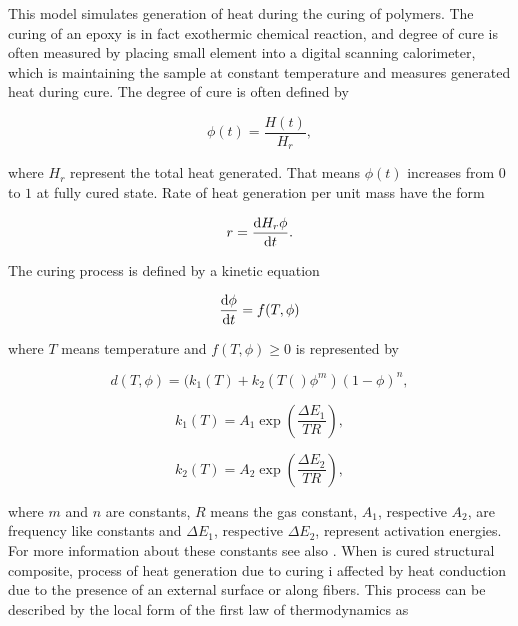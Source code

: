This model simulates generation of heat during the curing of polymers. The curing of an epoxy is in fact exothermic chemical reaction, and degree of cure is often measured by placing small element into a digital scanning calorimeter, which is maintaining the sample at constant temperature and measures generated heat during cure. The degree of cure is often defined by

\begin{equation}
	\phi(t) = \dfrac{H(t)}{H_r},
\end{equation}

where $H_r$ represent the total heat generated. That means $\phi(t)$ increases from $0$ to $1$ at fully cured state. Rate of heat generation per unit mass have the form

\begin{equation}
	r = \dv{H_r\phi}{t}.
\end{equation}

The curing process is defined by a kinetic equation 

\begin{equation}\label{eq:curing_process}
	\dv{\phi}{t} = f(T,\phi)
\end{equation}

where $T$ means temperature and $f(T,\phi)\geq 0$ is represented by 

\begin{equation}\label{eq:temperature_function}
	d(T,\phi) = (k_1(T)+k_2(T()\phi^m)(1-\phi)^n,
\end{equation}

\begin{equation}
	k_1(T) = A_1 \exp \left(\dfrac{\Delta E_1}{TR}\right),
\end{equation}

\begin{equation}
	k_2(T) = A_2 \exp \left( \dfrac{\Delta E_2}{TR}\right),
\end{equation}

where $m$ and $n$ are constants, $R$ means the gas constant, $A_1$, respective $A_2$, are frequency like constants and $\Delta E_1$, respective $\Delta E_2$, represent activation energies. For more information about these constants see also \cite{heinrich2012generation}.
When is cured structural composite, process of heat generation due to curing i affected by heat conduction due to the presence of an external surface or along fibers. This process can be described by the local form of the first law of thermodynamics as

